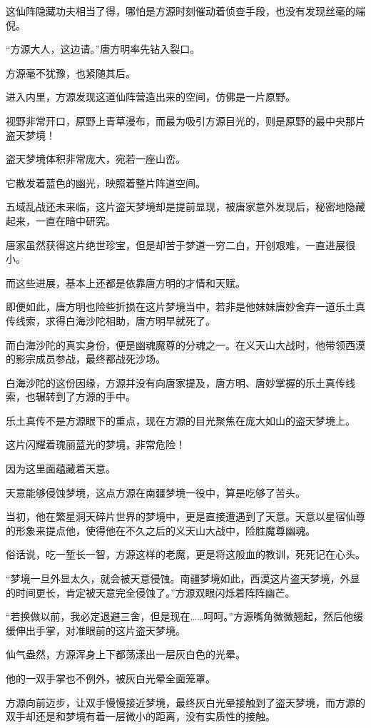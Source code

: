 \begin{this_body}
这仙阵隐藏功夫相当了得，哪怕是方源时刻催动着侦查手段，也没有发现丝毫的端倪。

“方源大人，这边请。”唐方明率先钻入裂口。

方源毫不犹豫，也紧随其后。

进入内里，方源发现这道仙阵营造出来的空间，仿佛是一片原野。

视野非常开口，原野上青草漫布，而最为吸引方源目光的，则是原野的最中央那片盗天梦境！

盗天梦境体积非常庞大，宛若一座山峦。

它散发着蓝色的幽光，映照着整片阵道空间。

五域乱战还未来临，这片盗天梦境却是提前显现，被唐家意外发现后，秘密地隐藏起来，一直在暗中研究。

唐家虽然获得这片绝世珍宝，但是却苦于梦道一穷二白，开创艰难，一直进展很小。

而这些进展，基本上还都是依靠唐方明的才情和天赋。

即便如此，唐方明也险些折损在这片梦境当中，若非是他妹妹唐妙舍弃一道乐土真传线索，求得白海沙陀相助，唐方明早就死了。

而白海沙陀的真实身份，便是幽魂魔尊的分魂之一。在义天山大战时，他带领西漠的影宗成员参战，最终都战死沙场。

白海沙陀的这份因缘，方源并没有向唐家提及，唐方明、唐妙掌握的乐土真传线索，也辗转到了方源的手中。

乐土真传不是方源眼下的重点，现在方源的目光聚焦在庞大如山的盗天梦境上。

这片闪耀着瑰丽蓝光的梦境，非常危险！

因为这里面蕴藏着天意。

天意能够侵蚀梦境，这点方源在南疆梦境一役中，算是吃够了苦头。

当初，他在繁星洞天碎片世界的梦境中，更是直接遭遇到了天意。天意以星宿仙尊的形象来提点他，使得他在不久之后的义天山大战中，险胜魔尊幽魂。

俗话说，吃一堑长一智，方源这样的老魔，更是将这般血的教训，死死记在心头。

“梦境一旦外显太久，就会被天意侵蚀。南疆梦境如此，西漠这片盗天梦境，外显的时间更长，肯定被天意完全侵蚀了。”方源双眼闪烁着阵阵幽芒。

“若换做以前，我必定退避三舍，但是现在……呵呵。”方源嘴角微微翘起，然后他缓缓伸出手掌，对准眼前的这片盗天梦境。

仙气盎然，方源浑身上下都荡漾出一层灰白色的光晕。

他的一双手掌也不例外，被灰白光晕全面笼罩。

方源向前迈步，让双手慢慢接近梦境，最终灰白光晕接触到了盗天梦境，而方源的双手却还是和梦境有着一层微小的距离，没有实质性的接触。


\end{this_body}
